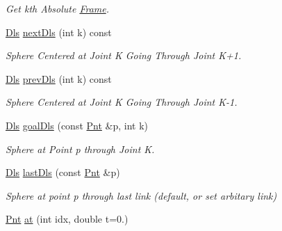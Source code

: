 \begin{DoxyCompactItemize}
\begin{DoxyCompactList}\small\item\em Get kth Absolute \hyperlink{classvsr_1_1_frame}{Frame}. \end{DoxyCompactList}\item 
\hypertarget{classvsr_1_1_chain_a9267a5da3c2b20ba583243581efee379}{\hyperlink{classvsr_1_1_m_v}{Dls} \hyperlink{classvsr_1_1_chain_a9267a5da3c2b20ba583243581efee379}{next\-Dls} (int k) const }\label{classvsr_1_1_chain_a9267a5da3c2b20ba583243581efee379}

\begin{DoxyCompactList}\small\item\em Sphere Centered at Joint K Going Through Joint K+1. \end{DoxyCompactList}\item 
\hypertarget{classvsr_1_1_chain_af14561a5e18ac0d42bd12cd98e06e5d4}{\hyperlink{classvsr_1_1_m_v}{Dls} \hyperlink{classvsr_1_1_chain_af14561a5e18ac0d42bd12cd98e06e5d4}{prev\-Dls} (int k) const }\label{classvsr_1_1_chain_af14561a5e18ac0d42bd12cd98e06e5d4}

\begin{DoxyCompactList}\small\item\em Sphere Centered at Joint K Going Through Joint K-\/1. \end{DoxyCompactList}\item 
\hypertarget{classvsr_1_1_chain_ac4eb8410bfc20476d6ef17a8cda8d15a}{\hyperlink{classvsr_1_1_m_v}{Dls} \hyperlink{classvsr_1_1_chain_ac4eb8410bfc20476d6ef17a8cda8d15a}{goal\-Dls} (const \hyperlink{namespacevsr_a2d05beb9721c5d9211b479af6d47222d}{Pnt} \&p, int k)}\label{classvsr_1_1_chain_ac4eb8410bfc20476d6ef17a8cda8d15a}

\begin{DoxyCompactList}\small\item\em Sphere at Point p through Joint K. \end{DoxyCompactList}\item 
\hypertarget{classvsr_1_1_chain_a8f488210bec1f2cf24178dd0dd255ce5}{\hyperlink{classvsr_1_1_m_v}{Dls} \hyperlink{classvsr_1_1_chain_a8f488210bec1f2cf24178dd0dd255ce5}{last\-Dls} (const \hyperlink{namespacevsr_a2d05beb9721c5d9211b479af6d47222d}{Pnt} \&p)}\label{classvsr_1_1_chain_a8f488210bec1f2cf24178dd0dd255ce5}

\begin{DoxyCompactList}\small\item\em Sphere at point p through last link (default, or set arbitary link) \end{DoxyCompactList}\item 
\hypertarget{classvsr_1_1_chain_aa1b52c96665a60bf807dbb2e9e4c029f}{\hyperlink{namespacevsr_a2d05beb9721c5d9211b479af6d47222d}{Pnt} \hyperlink{classvsr_1_1_chain_aa1b52c96665a60bf807dbb2e9e4c029f}{at} (int idx, double t=0.)}\label{classvsr_1_1_chain_aa1b52c96665a60bf807dbb2e9e4c029f}


\end{DoxyCompactItemize}

